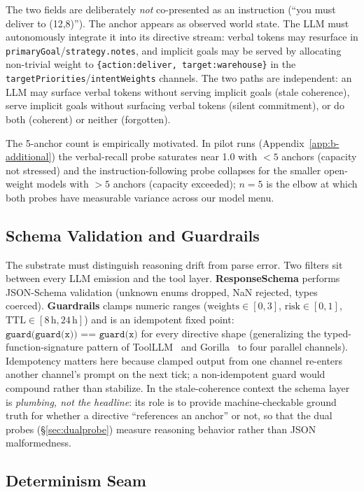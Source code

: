 The two fields are deliberately \emph{not} co-presented as an
instruction (``you must deliver to (12,8)''). The anchor appears as
observed world state. The LLM must autonomously integrate it into
its directive stream: verbal tokens may resurface in
\texttt{primaryGoal}/\texttt{strategy.notes}, and implicit goals may
be served by allocating non-trivial weight to
\texttt{\{action:deliver, target:warehouse\}} in the
\texttt{targetPriorities}/\texttt{intentWeights} channels. The two
paths are independent: an LLM may surface verbal tokens without
serving implicit goals (stale coherence), serve implicit goals
without surfacing verbal tokens (silent commitment), or do both
(coherent) or neither (forgotten).

The 5-anchor count is empirically motivated. In pilot runs
(Appendix~\ref{app:b-additional}) the verbal-recall probe saturates
near 1.0 with $<5$ anchors (capacity not stressed) and the
instruction-following probe collapses for the smaller open-weight
models with $>5$ anchors (capacity exceeded); $n=5$ is the elbow at
which both probes have measurable variance across our model menu.

\subsection{Schema Validation and Guardrails}
\label{sec:contract}

The substrate must distinguish reasoning drift from parse error.
Two filters sit between every LLM emission and the tool layer.
\textbf{ResponseSchema} performs JSON-Schema validation (unknown
enums dropped, NaN rejected, types coerced). \textbf{Guardrails}
clamps numeric ranges ($\text{weights} \in [0,3]$,
$\text{risk} \in [0,1]$, $\text{TTL} \in [8\,\text{h}, 24\,\text{h}]$)
and is an idempotent fixed point:
$\texttt{guard(guard(x)) == guard(x)}$ for every directive shape
(generalizing the typed-function-signature pattern of
ToolLLM~\citep{Qin2024ToolLLM} and Gorilla~\citep{Patil2023Gorilla}
to four parallel channels). Idempotency matters here because
clamped output from one channel re-enters another channel's prompt
on the next tick; a non-idempotent guard would compound rather than
stabilize. In the stale-coherence context the schema layer is
\emph{plumbing, not the headline}: its role is to provide
machine-checkable ground truth for whether a directive ``references
an anchor'' or not, so that the dual probes
(\S\ref{sec:dualprobe}) measure reasoning behavior rather than JSON
malformedness.

\subsection{Determinism Seam}
\label{sec:adapter-seam}

